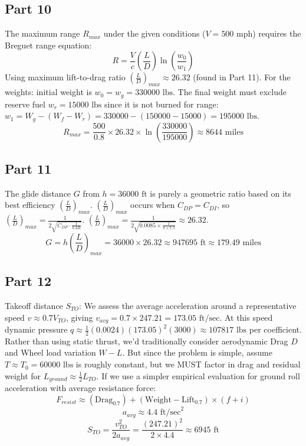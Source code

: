 \documentclass{KPS_assignment}
\begin{document}
\subsection*{Part 10}
The maximum range $R_{max}$ under the given conditions ($V = 500 \text{ mph}$) requires the Breguet range equation:
$$ R = \frac{V}{c} \left( \frac{L}{D} \right) \ln\left( \frac{w_0}{w_1} \right) $$
Using maximum lift-to-drag ratio $\left(\frac{L}{D}\right)_{max} \approx 26.32$ (found in Part 11).
For the weights: initial weight is $w_0 = w_g = 330000 \text{ lbs}$. The final weight must exclude reserve fuel $w_r = 15000 \text{ lbs}$ since it is not burned for range: 
$w_1 = W_g - (W_f - W_r) = 330000 - (150000 - 15000) = 195000 \text{ lbs}$.
$$ R_{max} = \frac{500}{0.8} \times 26.32 \times \ln\left( \frac{330000}{195000} \right) \approx 8644 \text{ miles} $$

\subsection*{Part 11}
The glide distance $G$ from $h = 36000 \text{ ft}$ is purely a geometric ratio based on its best efficiency $\left(\frac{L}{D}\right)_{max}$.
$\left(\frac{L}{D}\right)_{max}$ occurs when $C_{DP} = C_{DI}$, so $\left(\frac{L}{D}\right)_{max} = \frac{1}{2\sqrt{C_{DP} \cdot \frac{1}{\pi AR}}}$.
$\left(\frac{L}{D}\right)_{max} = \frac{1}{2\sqrt{0.0085 \times \frac{1}{\pi \times 7.5}}} \approx 26.32$.
$$ G = h \left( \frac{L}{D} \right)_{max} = 36000 \times 26.32 \approx 947695 \text{ ft} \approx 179.49 \text{ miles} $$

\subsection*{Part 12}
Takeoff distance $S_{TO}$: We assess the average acceleration around a representative speed $v \approx 0.7 V_{TO}$, giving $v_{avg} = 0.7 \times 247.21 = 173.05 \text{ ft/sec}$.
At this speed dynamic pressure $q \approx \frac{1}{2}(0.0024)(173.05)^2(3000) \approx 107817 \text{ lbs}$ per coefficient.
Rather than using static thrust, we'd traditionally consider aerodynamic Drag $D$ and Wheel load variation $W - L$. But since the problem is simple, assume $T \approx T_0 = 60000 \text{ lbs}$ is roughly constant, but we MUST factor in drag and residual weight for $L_{ground} \approx \frac{1}{2}L_{TO}$.
If we use a simpler empirical evaluation for ground roll acceleration with average resistance force:
$$ F_{resist} \approx (\text{Drag}_{0.7}) + (\text{Weight} - \text{Lift}_{0.7}) \times (f + i) $$
$$ a_{avg} \approx 4.4 \text{ ft/sec}^2 $$
$$ S_{TO} = \frac{v_{TO}^2}{2 a_{avg}} = \frac{(247.21)^2}{2 \times 4.4} \approx 6945 \text{ ft} $$
\end{document}
